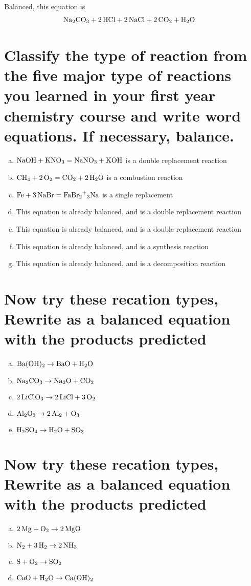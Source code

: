 \documentclass{scrartcl}
\begin{document}
Balanced, this equation is
\begin{align*}
&\ce{Na2CO3 + 2HCl}+\ce{2NaCl + 2CO2 + H2O}
\end{align*}

\section{Classify the type of reaction from the five major type of reactions you learned in your first year chemistry course and write word equations. If necessary, balance.}
\label{sec:org1ec6d49}
\begin{enumerate}[a.]
\item \(\ce{NaOH + KNO3}=\ce{NaNO3 + KOH}\) is a double replacement reaction
\item \(\ce{CH4 + 2O2}=\ce{CO2 + 2H2O}\) is a combustion reaction
\item \(\ce{Fe + 3NaBr}=\ce{FaBr2+3Na}\) is a single replacement
\item This equation is already balanced, and is a double replacement reaction
\item This equation is already balanced, and is a double replacement reaction
\item This equation is already balanced, and is a synthesis reaction
\item This equation is already balanced, and is a decomposition reaction
\end{enumerate}

\section{Now try these recation types, Rewrite as a balanced equation with the products predicted}
\label{sec:orgc2ff63c}
\begin{enumerate}[a.]
\item \(\ce{Ba(OH)2}\rightarrow\ce{BaO + H2O}\)
\item \(\ce{Na2CO3}\rightarrow\ce{Na2O + CO2}\)
\item \(\ce{2LiClO3}\rightarrow\ce{2LiCl + 3O2}\)
\item \(\ce{Al2O3}\rightarrow\ce{2Al2 + O3}\)
\item \(\ce{H2SO4}\rightarrow\ce{H2O + SO3}\)
\end{enumerate}

\section{Now try these recation types, Rewrite as a balanced equation with the products predicted}
\label{sec:org1a6233b}
\begin{enumerate}[a.]
\item \(\ce{2Mg + O2}\rightarrow\ce{2MgO}\)
\item \(\ce{N2 + 3H2}\rightarrow\ce{2NH3}\)
\item \(\ce{S + O2}\rightarrow\ce{SO2}\)
\item \(\ce{CaO + H2O}\rightarrow\ce{Ca(OH)2}\)
\end{enumerate}
\end{document}
